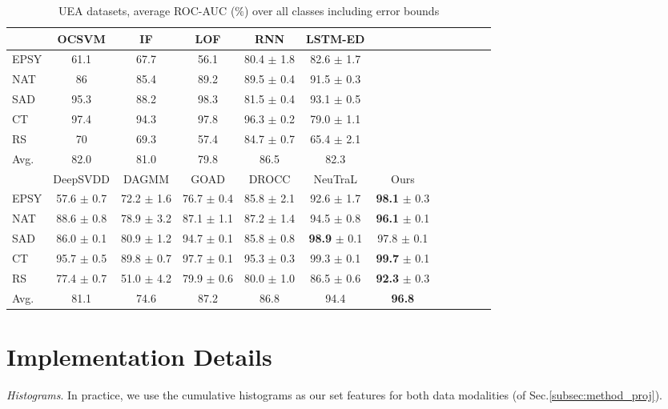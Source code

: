 \documentclass{article}
\begin{document}
\begin{table*}[h]
\caption{UEA datasets, average ROC-AUC  ($\%$) over all classes including error bounds}
\centering
\small
\begin{tabular}{lccccccccccc}
\toprule

	&	OCSVM	&	IF	&	LOF	&	RNN			&	LSTM-ED			\\ \midrule						
EPSY	&	61.1	&	67.7	&	56.1	&	80.4	$\pm$	1.8	&	82.6	$\pm$	1.7	\\						
NAT	&	86	&	85.4	&	89.2	&	89.5	$\pm$	0.4	&	91.5	$\pm$	0.3	\\						
SAD	&	95.3	&	88.2	&	98.3	&	81.5	$\pm$	0.4	&	93.1	$\pm$	0.5	\\						
CT	&	97.4	&	94.3	&	97.8	&	96.3	$\pm$	0.2	&	79.0	$\pm$	1.1	\\						
RS	&	70	&	69.3	&	57.4	&	84.7	$\pm$	0.7	&	65.4	$\pm$	2.1	\\ \midrule						
Avg.	&	82.0	&	81.0	&	79.8	&	86.5			&	82.3			\\ \midrule						
	&	DeepSVDD	& DAGMM	&			GOAD			&	DROCC			&	NeuTraL			&	Ours			\\ \midrule
EPSY	&	57.6	$\pm$ 0.7	 & 72.2 $\pm$ 1.6	 &	76.7	$\pm$	0.4	&	85.8	$\pm$	2.1	&	92.6	$\pm$	1.7	&	\textbf{98.1}	$\pm$	0.3	\\
NAT	&	88.6	$\pm$	0.8	& 78.9 $\pm$ 3.2 &	87.1	$\pm$	1.1	&	87.2	$\pm$	1.4	&	94.5	$\pm$	0.8	&	\textbf{96.1}	$\pm$	0.1	\\
SAD	&	86.0	$\pm$	0.1	&  80.9 $\pm$ 1.2 & 	94.7	$\pm$	0.1	&	85.8	$\pm$	0.8	&	\textbf{98.9}	$\pm$	0.1	&	97.8	$\pm$	0.1	\\
CT	&	95.7	$\pm$	0.5 & 89.8 $\pm$ 0.7	&	97.7	$\pm$	0.1	&	95.3	$\pm$	0.3	&	99.3	$\pm$	0.1	&	\textbf{99.7}	$\pm$	0.1	\\
RS	&	77.4	$\pm$	0.7	& 51.0 $\pm$ 4.2	& 79.9	$\pm$	0.6	&	80.0	$\pm$	1.0	&	86.5	$\pm$	0.6	& \textbf{92.3}	$\pm$	0.3	\\ \midrule	
Avg.	&	81.1			& 74.6	& 87.2			&	86.8			&	94.4			&	\textbf{96.8	}		\\

\bottomrule
\end{tabular}
\label{tab:realworld_errorbounds}
\end{table*}



\section{Implementation Details}
\label{app:imp}

\textit{Histograms}. In practice, we use the cumulative histograms as our set features for both data modalities (of Sec.\ref{subsec:method_proj}).
\end{document}
